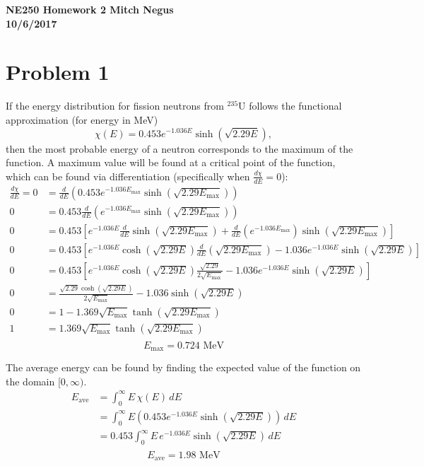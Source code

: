 \documentclass{article}
\begin{document}
\thispagestyle{empty}

{\bf {\large {NE250 Homework {2} \hfill Mitch Negus\\
		\hspace*{\fill} 10/6/2017\\ }}}
		

\section*{Problem 1}

If the energy distribution for fission neutrons from $^{235}\text{U}$ follows the functional approximation (for energy in MeV)
$$ \chi(E) = 0.453e^{-1.036E}\sinh(\sqrt{2.29E}), $$
then the most probable energy of a neutron corresponds to the maximum of the function. A maximum value will be found at a critical point of the function, which can be found via differentiation (specifically when $\frac{d\chi}{dE} = 0$):
\begin{align*}
\frac{d\chi}{dE}= 0	&= \frac{d}{dE}\left(0.453e^{-1.036E_{\text{max}}}\sinh(\sqrt{2.29E_{\text{max}}})\right) \\
				  0	&= 0.453\frac{d}{dE}\left(e^{-1.036E_{\text{max}}}\sinh(\sqrt{2.29E_{\text{max}}})\right) \\
				  0	&= 0.453\left[e^{-1.036E}\frac{d}{dE}\sinh(\sqrt{2.29E_{\text{max}}})+\frac{d}{dE}\left(e^{-1.036E_{\text{max}}}\right)\sinh(\sqrt{2.29E_{\text{max}}})\right] \\
				  0	&= 0.453\left[e^{-1.036E}\cosh(\sqrt{2.29E})\frac{d}{dE}\left(\sqrt{2.29E_{\text{max}}}\right)-1.036e^{-1.036E}\sinh(\sqrt{2.29E})\right] \\
				  0	&= 0.453\left[e^{-1.036E}\cosh(\sqrt{2.29E})\frac{\sqrt{2.29}}{2\sqrt{E_{\text{max}}}}-1.036e^{-1.036E}\sinh(\sqrt{2.29E})\right] \\
				  0	&= \frac{\sqrt{2.29}\cosh(\sqrt{2.29E})}{2\sqrt{E_{\text{max}}}}-1.036\sinh(\sqrt{2.29E}) \\
				  0	&= 1 - 1.369\sqrt{E_{\text{max}}}\tanh(\sqrt{2.29E_{\text{max}}}) \\
				  1	&= 1.369\sqrt{E_{\text{max}}}\tanh(\sqrt{2.29E_{\text{max}}}) \\
\end{align*}
$$\boxed{ E_{\text{max}}= 0.724\text{ MeV} }$$

The average energy can be found by finding the expected value of the function on the domain $[0,\infty)$.
\begin{align*}
E_{\text{ave}}	&= \int_0^{\infty} E\,\chi(E)\,dE \\
				&= \int_0^{\infty} E\left(0.453e^{-1.036E}\sinh(\sqrt{2.29E})\right)\,dE \\
				&= 0.453\int_0^{\infty} E\,e^{-1.036E}\sinh(\sqrt{2.29E})\,dE \\
\end{align*}
$$\boxed{ E_{\text{ave}} = 1.98\text{ MeV} }$$
\end{document}
